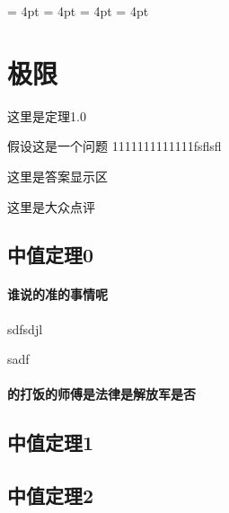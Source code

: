 \documentclass[no-math]{lecture}
\begin{document}
	\raggedbottom
	\abovedisplayshortskip = 4pt
	\belowdisplayshortskip = 4pt
	\abovedisplayskip 		 = 4pt
	\belowdisplayskip 		 = 4pt
	\frontmatter
		\tableofcontents
	\mainmatter
\newpage
	\chapter{极限}
	\begin{Theorems}
	这里是定理1.0
	\end{Theorems}
	假设这是一个问题	1111111111111fsflsfl
\begin{PROBLEMANSWERS}
	\begin{Analysis}
		这里是答案显示区
	\end{Analysis}
	\begin{Assess}
		这里是大众点评
	\end{Assess}
\end{PROBLEMANSWERS}

	


	\section{中值定理0}
		\subsubsection{谁说的准的事情呢}
\begin{DerivativeExamples}
	\item  sdfsdjl
	\item  sadf
	\end{DerivativeExamples}
		\subsubsection{的打饭的师傅是法律是解放军是否}
	\section{中值定理1}
	\section{中值定理2}
\end{document}
